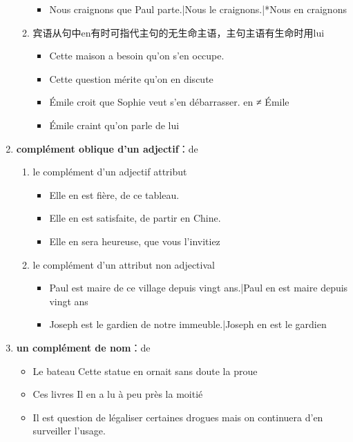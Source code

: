 \documentclass[UTF8]{report}
\begin{document}
\begin{enumerate}
\begin{enumerate}
\begin{itemize}
            \item Nous craignons que Paul parte.|Nous le craignons.|*Nous en craignons
        \end{itemize}
        \item 宾语从句中en有时可指代主句的无生命主语，主句主语有生命时用lui
        \begin{itemize}
            \item Cette maison a besoin qu’on s’en occupe.
            \item Cette question mérite qu’on en discute
            \item Émile croit que Sophie veut s’en débarrasser. en ≠ Émile
            \item Émile craint qu’on parle de lui
        \end{itemize}
    \end{enumerate}
    \item \textbf{complément oblique d’un adjectif}：de
    \begin{enumerate}
        \item le complément d’un adjectif attribut
        \begin{itemize}
            \item Elle en est fière, de ce tableau.
            \item Elle en est satisfaite, de partir en Chine.
            \item Elle en sera heureuse, que vous l’invitiez
        \end{itemize}
        \item le complément d’un attribut non adjectival
        \begin{itemize}
            \item Paul est maire de ce village depuis vingt ans.|Paul en est maire depuis vingt ans
            \item Joseph est le gardien de notre immeuble.|Joseph en est le gardien
        \end{itemize}
    \end{enumerate}
    \item \textbf{un complément de nom}：de
    \begin{itemize}
        \item Le bateau Cette statue en ornait sans doute la proue
        \item Ces livres Il en a lu à peu près la moitié
        \item Il est question de légaliser certaines drogues mais on continuera d’en surveiller l’usage.

\end{itemize}
\end{enumerate}
\end{document}
